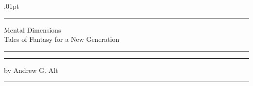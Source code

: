 \thispagestyle{empty}
\topskip.01pt
\vspace*{\fill}
\begin{center}
	\noindent\rule{\textwidth}{2pt}

	\vspace{10pt}
	{\Huge Mental Dimensions} \\

	\vspace{.5em}
	{\large Tales of Fantasy for a New Generation} \\

	\vspace{.5em}
	\noindent\rule{\textwidth}{2pt}

	\vspace{7in}

	\rule{\textwidth}{2pt}

	\vspace{.5em}
	{\large by Andrew G. Alt}

	\rule{\textwidth}{2pt}
\end{center}
\vspace*{\fill}
